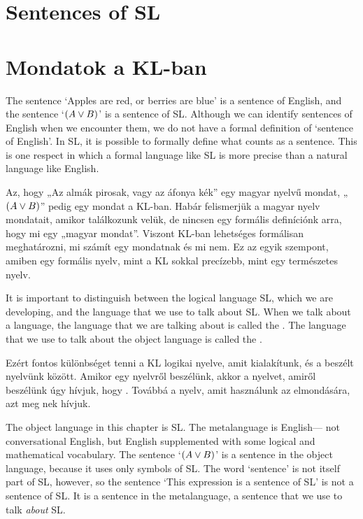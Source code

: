 \section*{Sentences of SL}
\section{Mondatok a KL-ban}
The sentence `Apples are red, or berries are blue' is a sentence of English, and the sentence `$(A\vee B)$' is a sentence of SL. Although we can identify sentences of English when we encounter them, we do not have a formal definition of `sentence of English'. In SL, it is possible to formally define what counts as a sentence. This is one respect in which a formal language like SL is more precise than a natural language like English.

Az, hogy „Az almák pirosak, vagy az áfonya kék” egy magyar nyelvű mondat, „$(A\vee B)$” pedig egy mondat a KL-ban. Habár felismerjük a magyar nyelv mondatait, amikor találkozunk velük, de nincsen egy formális definíciónk arra, hogy mi egy „magyar mondat”. Viszont KL-ban lehetséges formálisan meghatározni, mi számít egy mondatnak és mi nem. Ez az egyik szempont, amiben egy formális nyelv, mint a KL sokkal precízebb, mint egy természetes nyelv.

It is important to distinguish between the logical language SL, which we are developing, and the language that we use to talk about SL. When we talk about a language, the language that we are talking about is called the . The language that we use to talk about the object language is called the .
\label{def.metalanguage}

Ezért fontos különbséget tenni a KL logikai nyelve, amit kialakítunk, és a beszélt nyelvünk között. Amikor egy nyelvről beszélünk, akkor a nyelvet, amiről beszélünk úgy hívjuk, hogy . Továbbá a nyelv, amit használunk az elmondására, azt meg nek hívjuk.
\label{def.metanyelv}

The object language in this chapter is SL. The metalanguage is English--- not conversational English, but English supplemented with some logical and mathematical vocabulary. The sentence `$(A\vee B)$' is a sentence in the object language, because it uses only symbols of SL. The word `sentence' is not itself part of SL, however, so the sentence `This expression is a sentence of SL' is not a sentence of SL. It is a sentence in the metalanguage, a sentence that we use to talk \emph{about} SL.

